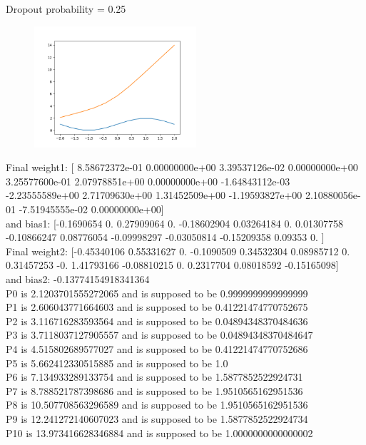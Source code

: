\documentclass{article}
\begin{document}
Dropout probability = 0.25\\
\begin{figure}[htp]
    \centering
    \includegraphics[width=6cm]{photos/ask7_25.png}
    \label{fig:2}
\end{figure}
Final weight1: [ 8.58672372e-01  0.00000000e+00  3.39537126e-02  0.00000000e+00
  3.25577600e-01  2.07978851e+00  0.00000000e+00 -1.64843112e-03
 -2.23555589e+00  2.71709630e+00  1.31452509e+00 -1.19593827e+00
  2.10880056e-01 -7.51945555e-02  0.00000000e+00]\\ and bias1: [-0.1690654   0.          0.27909064  0.         -0.18602904  0.03264184
  0.          0.01307758 -0.10866247  0.08776054 -0.09998297 -0.03050814
 -0.15209358  0.09353     0.        ]\\
Final weight2: [-0.45340106  0.55331627  0.         -0.1090509   0.34532304  0.08985712
  0.          0.31457253 -0.          1.41793166 -0.08810215  0.
  0.2317704   0.08018592 -0.15165098]\\ and bias2: -0.13774154918341364\\
P0 is 2.1203701555272065 and is supposed to be 0.9999999999999999\\
P1 is 2.606043771664603 and is supposed to be 0.41221474770752675\\
P2 is 3.116716283593564 and is supposed to be 0.04894348370484636\\
P3 is 3.7118037127905557 and is supposed to be 0.04894348370484647\\
P4 is 4.515802689577027 and is supposed to be 0.41221474770752686\\
P5 is 5.662412330515885 and is supposed to be 1.0\\
P6 is 7.134933289133754 and is supposed to be 1.5877852522924731\\
P7 is 8.788521787398686 and is supposed to be 1.9510565162951536\\
P8 is 10.507708563296589 and is supposed to be 1.9510565162951536\\
P9 is 12.241272140607023 and is supposed to be 1.5877852522924734\\
P10 is 13.973416628346884 and is supposed to be 1.0000000000000002\\
\end{document}

